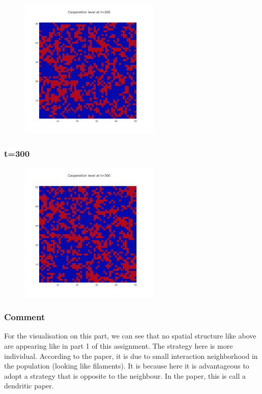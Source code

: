 \documentclass[11pt]{article}
\begin{document}
\begin{figure}[H]
\centering
   \includegraphics[width=0.6\textwidth]{img/part2/part2-moore-visu-200.png}
\end{figure}

\subsubsection{t=300}

\begin{figure}[H]
\centering
   \includegraphics[width=0.6\textwidth]{img/part2/part2-moore-visu-300.png}
\end{figure}

\subsubsection{Comment}

For the visualisation on this part, we can see that no spatial structure like above are appearing like in part 1 of this assignment. The strategy here is more individual. According to the paper, it is due to small interaction neighborhood in the population (looking like filaments). It is because here it is advantageous to adopt a strategy that is opposite to the neighbour. In the paper, this is call a dendritic paper.
\end{document}

